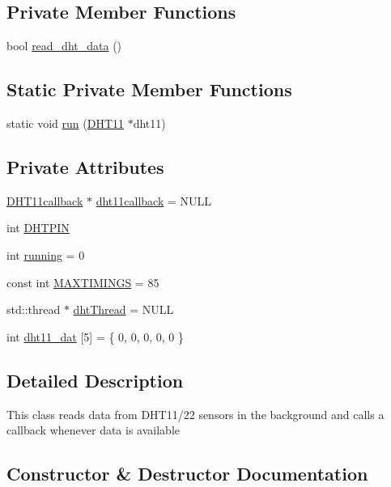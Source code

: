 \subsection*{Private Member Functions}
\begin{DoxyCompactItemize}
\item 
bool \hyperlink{classDHT11_abf4c039a75c0458ee45621c12feec0c7}{read\+\_\+dht\+\_\+data} ()
\end{DoxyCompactItemize}
\subsection*{Static Private Member Functions}
\begin{DoxyCompactItemize}
\item 
static void \hyperlink{classDHT11_ae1a44c906a97ff4398d4d6721a1c8780}{run} (\hyperlink{classDHT11}{D\+H\+T11} $\ast$dht11)
\end{DoxyCompactItemize}
\subsection*{Private Attributes}
\begin{DoxyCompactItemize}
\item 
\hyperlink{classDHT11callback}{D\+H\+T11callback} $\ast$ \hyperlink{classDHT11_aebe3e30af75be9b419eb2fde69cfc00d}{dht11callback} = N\+U\+LL
\item 
int \hyperlink{classDHT11_a4d99108d62275d5ccf72df9d17b3211b}{D\+H\+T\+P\+IN}
\item 
int \hyperlink{classDHT11_a5e1eeeaac76105d3c7db78b63cab007d}{running} = 0
\item 
const int \hyperlink{classDHT11_aba8c5976478e858ec94a70d29deac72d}{M\+A\+X\+T\+I\+M\+I\+N\+GS} = 85
\item 
std\+::thread $\ast$ \hyperlink{classDHT11_a5e25d02345012c339d450951df5cebf7}{dht\+Thread} = N\+U\+LL
\item 
int \hyperlink{classDHT11_aa90815a46d88e84c34f091bf8f208315}{dht11\+\_\+dat} \mbox{[}5\mbox{]} = \{ 0, 0, 0, 0, 0 \}
\end{DoxyCompactItemize}


\subsection{Detailed Description}
This class reads data from D\+H\+T11/22 sensors in the background and calls a callback whenever data is available 

\subsection{Constructor \& Destructor Documentation}
\mbox{\label{classDHT11_ad52a70ab511e087aaad53848d64ee976}} 

